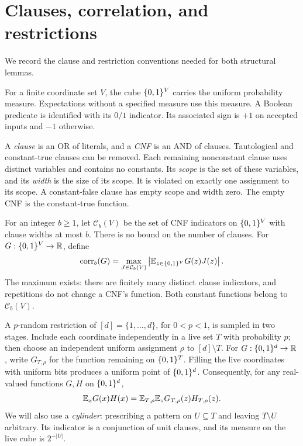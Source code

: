 \section{Clauses, correlation, and restrictions}\label{sec:preliminaries}

We record the clause and restriction conventions needed for both structural
lemmas.

For a finite coordinate set \(V\), the cube \(\{0,1\}^V\) carries the uniform
probability measure.  Expectations without a specified measure use this
measure.  A Boolean predicate is identified with its \(0/1\) indicator.
Its associated sign is \(+1\) on accepted inputs and \(-1\) otherwise.

A \emph{clause} is an OR of literals, and a \emph{CNF} is an AND of
clauses.  Tautological and constant-true clauses can be removed.
Each remaining nonconstant clause uses distinct variables and contains
no constants.  Its \emph{scope} is the set of these variables, and its
\emph{width} is the size of its scope.  It is violated on exactly one
assignment to its scope.  A constant-false clause has empty scope and
width zero.  The empty CNF is the constant-true function.

For an integer \(b\ge1\), let \(\mathcal C_b(V)\) be the set of CNF
indicators on \(\{0,1\}^V\) with clause widths at most \(b\).
There is no bound on the number of clauses.  For
\(G:\{0,1\}^V\to\mathbb R\), define
\begin{equation}\label{eq:correlation-definition}
 \operatorname{corr}_b(G)=\max_{J\in\mathcal C_b(V)}
               \left|\mathbb E_{z\in\{0,1\}^V}G(z)J(z)\right|.
\end{equation}
The maximum exists: there are finitely many distinct clause indicators,
and repetitions do not change a CNF's function.  Both constant functions
belong to \(\mathcal C_b(V)\).

A \(p\)-random restriction of \([d]=\{1,\ldots,d\}\), for \(0<p<1\),
is sampled in two stages.  Include each coordinate independently in
a live set \(T\) with probability \(p\); then choose an independent
uniform assignment \(\rho\) to \([d]\setminus T\).
For \(G:\{0,1\}^d\to\mathbb R\), write \(G_{T,\rho}\) for the function remaining
on \(\{0,1\}^T\).  Filling the live coordinates with uniform bits produces
a uniform point of \(\{0,1\}^d\).  Consequently, for any real-valued
functions \(G,H\) on \(\{0,1\}^d\),
\begin{equation}\label{eq:restriction-expectation}
 \mathbb E_xG(x)H(x)
  =\mathbb E_{T,\rho}\mathbb E_zG_{T,\rho}(z)H_{T,\rho}(z).
\end{equation}
We will also use a \emph{cylinder}: prescribing a pattern on
\(U\subseteq T\) and leaving \(T\setminus U\) arbitrary.
Its indicator is a conjunction of unit clauses, and its measure on
the live cube is \(2^{-|U|}\).
